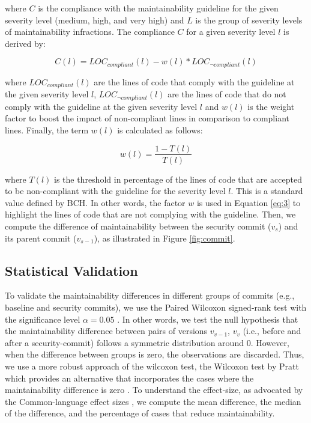 \documentclass[10pt,conference]{IEEEtran}
\begin{document}
\noindent
where $C$ is the compliance with the maintainability guideline for the given
severity level (medium, high, and very high) and $L$ is the group of severity
levels of maintainability infractions. The compliance $C$ for a given severity
level $l$ is derived by:

\begin{equation}\label{eq:3}
    C(l) = LOC_{compliant}(l) - w(l) * LOC_{\neg compliant}(l)
\end{equation}

\noindent
where $LOC_{compliant}(l)$ are the lines of code that comply with the guideline
at the given severity level $l$, $LOC_{\neg compliant}(l)$ are the lines of code
that do not comply with the guideline at the given severity level $l$ and $w(l)$
is the weight factor to boost the impact of non-compliant lines in comparison to
compliant lines. Finally, the term $w(l)$ is calculated as follows:

\begin{equation}
    w(l) = \frac{1 - T(l)}{T(l)}
\end{equation}

\noindent
where $T(l)$ is the threshold in percentage of the lines of code that are
accepted to be non-compliant with the guideline for the severity level $l$. This
is a standard value defined by BCH. In other words, the factor $w$ is used in
Equation \ref{eq:3} to highlight the lines of code that are not complying with
the guideline. Then, we compute the difference of maintainability between the
security commit ($v_{s}$) and its parent commit ($v_{s-1}$), as illustrated in
Figure \ref{fig:commit}.

\subsection{Statistical Validation}\label{sec:statsval}
%
To validate the maintainability differences in different groups of commits
(e.g., baseline and security commits), we use the Paired Wilcoxon signed-rank
test with the significance level $\alpha = 0.05$ \cite{10.2307/3001968} . In
other words, we test the null hypothesis that the maintainability difference
between pairs of versions $v_{v-1}$, $v_v$ (i.e., before and after a
security-commit) follows a symmetric distribution around $0$. However, when the
difference between groups is zero, the observations are discarded. Thus, we use
a more robust approach of the wilcoxon test, the Wilcoxon test by Pratt which
provides an alternative that incorporates the cases where the maintainability
difference is zero \cite{10.2307/2282543}. To understand the effect-size, as
advocated by the Common-language effect sizes \cite{graw:1992}, we compute the
mean difference, the median of the difference, and the percentage of cases that
reduce maintainability.
%
\end{document}
